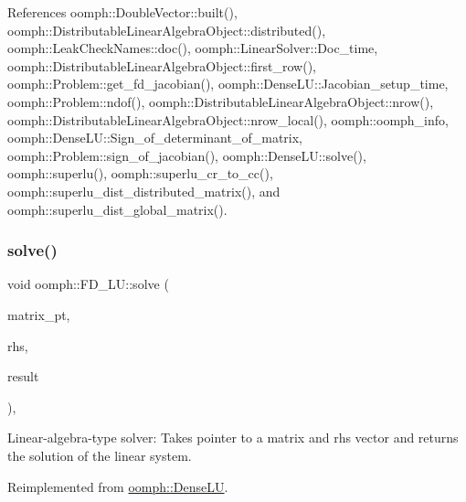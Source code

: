References oomph\+::\+Double\+Vector\+::built(), oomph\+::\+Distributable\+Linear\+Algebra\+Object\+::distributed(), oomph\+::\+Leak\+Check\+Names\+::doc(), oomph\+::\+Linear\+Solver\+::\+Doc\+\_\+time, oomph\+::\+Distributable\+Linear\+Algebra\+Object\+::first\+\_\+row(), oomph\+::\+Problem\+::get\+\_\+fd\+\_\+jacobian(), oomph\+::\+Dense\+L\+U\+::\+Jacobian\+\_\+setup\+\_\+time, oomph\+::\+Problem\+::ndof(), oomph\+::\+Distributable\+Linear\+Algebra\+Object\+::nrow(), oomph\+::\+Distributable\+Linear\+Algebra\+Object\+::nrow\+\_\+local(), oomph\+::oomph\+\_\+info, oomph\+::\+Dense\+L\+U\+::\+Sign\+\_\+of\+\_\+determinant\+\_\+of\+\_\+matrix, oomph\+::\+Problem\+::sign\+\_\+of\+\_\+jacobian(), oomph\+::\+Dense\+L\+U\+::solve(), oomph\+::superlu(), oomph\+::superlu\+\_\+cr\+\_\+to\+\_\+cc(), oomph\+::superlu\+\_\+dist\+\_\+distributed\+\_\+matrix(), and oomph\+::superlu\+\_\+dist\+\_\+global\+\_\+matrix().

\mbox{\label{classoomph_1_1FD__LU_ab8c9d6006352d0ea61a721b9c58cd523}} 
\subsubsection{\texorpdfstring{solve()}{solve()}\hspace{0.1cm}{\footnotesize\ttfamily [2/3]}}
{\footnotesize\ttfamily void oomph\+::\+F\+D\+\_\+\+L\+U\+::solve (\begin{DoxyParamCaption}\item[{\hyperlink{classoomph_1_1DoubleMatrixBase}{Double\+Matrix\+Base} $\ast$const \&}]{matrix\+\_\+pt,  }\item[{const \hyperlink{classoomph_1_1DoubleVector}{Double\+Vector} \&}]{rhs,  }\item[{\hyperlink{classoomph_1_1DoubleVector}{Double\+Vector} \&}]{result }\end{DoxyParamCaption})\hspace{0.3cm}{\ttfamily [inline]}, {\ttfamily [virtual]}}



Linear-\/algebra-\/type solver\+: Takes pointer to a matrix and rhs vector and returns the solution of the linear system. 



Reimplemented from \hyperlink{classoomph_1_1DenseLU_ae82e044bb5a1173b8105b6fedd904801}{oomph\+::\+Dense\+LU}.



